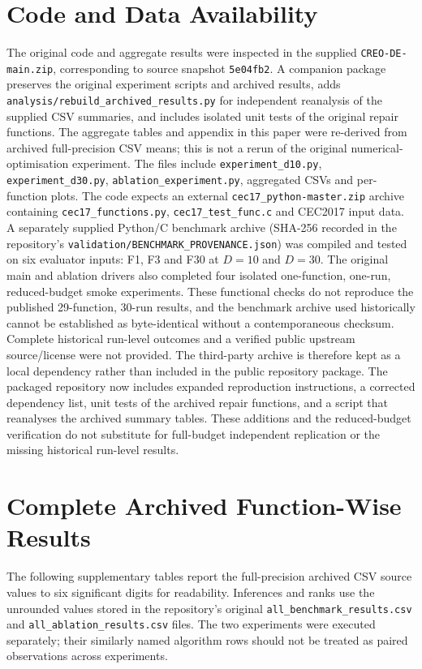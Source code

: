 \documentclass[a4paper,fleqn]{cas-sc}
\begin{document}
\section*{Code and Data Availability}

The original code and aggregate results were inspected in the supplied \texttt{CREO-DE-main.zip}, corresponding to source snapshot \texttt{5e04fb2}. A companion package preserves the original experiment scripts and archived results, adds \texttt{analysis/rebuild\_archived\_results.py} for independent reanalysis of the supplied CSV summaries, and includes isolated unit tests of the original repair functions. The aggregate tables and appendix in this paper were re-derived from archived full-precision CSV means; this is not a rerun of the original numerical-optimisation experiment. The files include \texttt{experiment\_d10.py}, \texttt{experiment\_d30.py}, \texttt{ablation\_experiment.py}, aggregated CSVs and per-function plots. The code expects an external \texttt{cec17\_python-master.zip} archive containing \texttt{cec17\_functions.py}, \texttt{cec17\_test\_func.c} and CEC2017 input data. A separately supplied Python/C benchmark archive (SHA-256 recorded in the repository's \texttt{validation/BENCHMARK\_PROVENANCE.json}) was compiled and tested on six evaluator inputs: F1, F3 and F30 at $D=10$ and $D=30$. The original main and ablation drivers also completed four isolated one-function, one-run, reduced-budget smoke experiments. These functional checks do not reproduce the published 29-function, 30-run results, and the benchmark archive used historically cannot be established as byte-identical without a contemporaneous checksum. Complete historical run-level outcomes and a verified public upstream source/license were not provided. The third-party archive is therefore kept as a local dependency rather than included in the public repository package. The packaged repository now includes expanded reproduction instructions, a corrected dependency list, unit tests of the archived repair functions, and a script that reanalyses the archived summary tables. These additions and the reduced-budget verification do not substitute for full-budget independent replication or the missing historical run-level results.

\appendix
\section{Complete Archived Function-Wise Results}
\label{app:archive}
The following supplementary tables report the full-precision archived CSV source values to six significant digits for readability. Inferences and ranks use the unrounded values stored in the repository's original \texttt{all\_benchmark\_results.csv} and \texttt{all\_ablation\_results.csv} files. The two experiments were executed separately; their similarly named algorithm rows should not be treated as paired observations across experiments.
\end{document}
